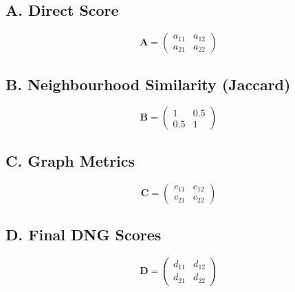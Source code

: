 \documentclass{article}
\begin{document}
\subsection*{A. Direct Score}
\[
\mathbf{A} = \begin{pmatrix}
a_{11} & a_{12} \\[4pt]
a_{21} & a_{22}
\end{pmatrix}
\]

\subsection*{B. Neighbourhood Similarity (Jaccard)}
\[
\mathbf{B} = \begin{pmatrix}
1 & 0.5 \\[4pt]
0.5 & 1
\end{pmatrix}
\]

\subsection*{C. Graph Metrics}
\[
\mathbf{C} = \begin{pmatrix}
c_{11} & c_{12} \\[4pt]
c_{21} & c_{22}
\end{pmatrix}
\]

\subsection*{D. Final DNG Scores}
\[
\mathbf{D} = \begin{pmatrix}
d_{11} & d_{12} \\[4pt]
d_{21} & d_{22}
\end{pmatrix}
\]
\end{document}
